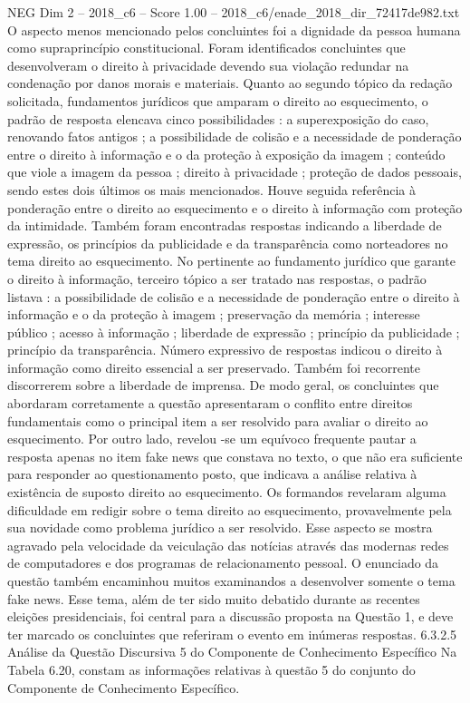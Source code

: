 \begin{textsample}{NEG Dim 2 – 2018\_c6 – Score 1.00 – 2018\_c6/enade\_2018\_dir\_72417de982.txt}
O aspecto menos mencionado pelos concluintes foi a dignidade da pessoa humana como supraprincípio constitucional.
Foram identificados concluintes que desenvolveram o direito à privacidade devendo sua violação redundar na condenação por danos morais e materiais.
Quanto ao segundo tópico da redação solicitada, fundamentos jurídicos que amparam o direito ao esquecimento, o padrão de resposta elencava cinco possibilidades : a superexposição do caso, renovando fatos antigos ; a possibilidade de colisão e a necessidade de ponderação entre o direito à informação e o da proteção à exposição da imagem ; conteúdo que viole a imagem da pessoa ; direito à privacidade ; proteção de dados pessoais, sendo estes dois últimos os mais mencionados.
Houve seguida referência à ponderação entre o direito ao esquecimento e o direito à informação com proteção da intimidade.
Também foram encontradas respostas indicando a liberdade de expressão, os princípios da publicidade e da transparência como norteadores no tema direito ao esquecimento.
No pertinente ao fundamento jurídico que garante o direito à informação, terceiro tópico a ser tratado nas respostas, o padrão listava : a possibilidade de colisão e a necessidade de ponderação entre o direito à informação e o da proteção à imagem ; preservação da memória ; interesse público ; acesso à informação ; liberdade de expressão ; princípio da publicidade ; princípio da transparência.
Número expressivo de respostas indicou o direito à informação como direito essencial a ser preservado.
Também foi recorrente discorrerem sobre a liberdade de imprensa.
De modo geral, os concluintes que abordaram corretamente a questão apresentaram o conflito entre direitos fundamentais como o principal item a ser resolvido para avaliar o direito ao esquecimento.
Por outro lado, revelou -se um equívoco frequente pautar a resposta apenas no item fake news que constava no texto, o que não era suficiente para responder ao questionamento posto, que indicava a análise relativa à existência de suposto direito ao esquecimento.
Os formandos revelaram alguma dificuldade em redigir sobre o tema direito ao esquecimento, provavelmente pela sua novidade como problema jurídico a ser resolvido.
Esse aspecto se mostra agravado pela velocidade da veiculação das notícias através das modernas redes de computadores e dos programas de relacionamento pessoal.
O enunciado da questão também encaminhou muitos examinandos a desenvolver somente o tema fake news.
Esse tema, além de ter sido muito debatido durante as recentes eleições presidenciais, foi central para a discussão proposta na Questão 1, e deve ter marcado os concluintes que referiram o evento em inúmeras respostas. 6.3.2.5 Análise da Questão Discursiva 5 do Componente de Conhecimento Específico Na Tabela 6.20, constam as informações relativas à questão 5 do conjunto do Componente de Conhecimento Específico.

\end{textsample}

